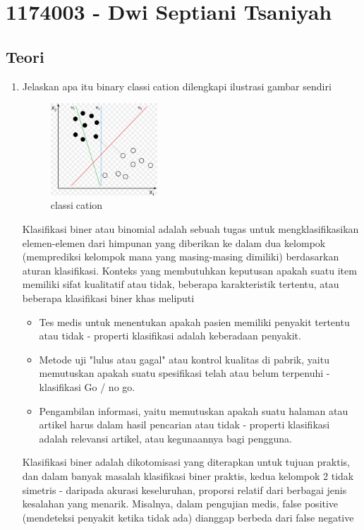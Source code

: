 \section{1174003 - Dwi Septiani Tsaniyah}
\subsection{Teori}
\begin{enumerate}
	\item Jelaskan apa itu binary classication dilengkapi ilustrasi gambar sendiri
	\hfill\break
	\begin{figure}[H]
		\includegraphics[width=4cm]{figures/1174003/2/1.jpg}
		\centering
		\caption{classication}
	\end{figure}
	Klasifikasi biner atau binomial adalah sebuah tugas untuk mengklasifikasikan elemen-elemen dari himpunan yang diberikan ke dalam dua kelompok (memprediksi kelompok mana yang masing-masing dimiliki) berdasarkan aturan klasifikasi. 
	Konteks yang membutuhkan keputusan apakah suatu item memiliki sifat kualitatif atau tidak, beberapa karakteristik tertentu, atau beberapa klasifikasi biner khas meliputi
	\begin{itemize}
		\item Tes medis untuk menentukan apakah pasien memiliki penyakit tertentu atau tidak - properti klasifikasi adalah keberadaan penyakit.
		\item Metode uji "lulus atau gagal" atau kontrol kualitas di pabrik, yaitu memutuskan apakah suatu spesifikasi telah atau belum terpenuhi - klasifikasi Go / no go.
		\item Pengambilan informasi, yaitu memutuskan apakah suatu halaman atau artikel harus dalam hasil pencarian atau tidak - properti klasifikasi adalah relevansi artikel, atau kegunaannya bagi pengguna.
	\end{itemize}
	\hfill\break
	Klasifikasi biner adalah dikotomisasi yang diterapkan untuk tujuan praktis, dan dalam banyak masalah klasifikasi biner praktis, 
	kedua kelompok 2 tidak simetris - daripada akurasi keseluruhan, proporsi relatif dari berbagai jenis kesalahan yang menarik. 
	Misalnya, dalam pengujian medis, false positive (mendeteksi penyakit ketika tidak ada) dianggap berbeda dari false negative 

\end{enumerate}
